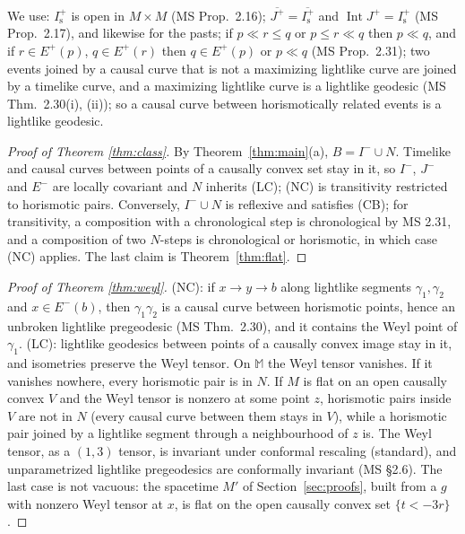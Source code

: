 \documentclass[11pt]{article}
\theoremstyle{definition}
\newcommand{\Mink}{\mathbb M}
\newcommand{\Ifut}{I^{+}}
\newcommand{\Ichr}{I^{-}}
\newcommand{\Jp}{J^{+}}
\newcommand{\Jm}{J^{-}}
\begin{document}
We use: $\Ifut_{\mathrm s}$ is open in $M\times M$ (MS Prop.~2.16);
$\overline{\Jp}=\overline{\Ifut_{\mathrm s}}$ and $\operatorname{Int}\Jp=
\Ifut_{\mathrm s}$ (MS Prop.~2.17), and likewise for the pasts; if $p\ll r\le q$
or $p\le r\ll q$ then $p\ll q$, and if $r\in E^+(p)$, $q\in E^+(r)$ then
$q\in E^+(p)$ or $p\ll q$ (MS Prop.~2.31); two events joined by a causal
curve that is not a maximizing lightlike curve are joined by a timelike curve,
and a maximizing lightlike curve is a lightlike geodesic (MS Thm.~2.30(i),
(ii)); so a causal curve between horismotically related events is a lightlike
geodesic.

\begin{proof}[Proof of Theorem \ref{thm:class}]
By Theorem~\ref{thm:main}(a), $B=\Ichr\cup N$. Timelike and causal curves
between points of a causally convex set stay in it, so $\Ichr$, $\Jm$ and $E^-$
are locally covariant and $N$ inherits (LC); (NC) is transitivity restricted
to horismotic pairs. Conversely, $\Ichr\cup N$ is reflexive and satisfies (CB);
for transitivity, a composition with a chronological step is chronological by
MS 2.31, and a composition of two $N$-steps is chronological or horismotic, in
which case (NC) applies. The last claim is Theorem~\ref{thm:flat}.
\end{proof}

\begin{proof}[Proof of Theorem \ref{thm:weyl}]
(NC): if $x\to y\to b$ along lightlike segments $\gamma_1,\gamma_2$ and
$x\in E^-(b)$, then $\gamma_1\gamma_2$ is a causal curve between horismotic
points, hence an unbroken lightlike pregeodesic (MS Thm.~2.30), and it
contains the Weyl point of $\gamma_1$. (LC): lightlike geodesics between points
of a causally convex image stay in it, and isometries preserve the Weyl
tensor. On $\Mink$ the Weyl tensor vanishes. If it vanishes nowhere, every
horismotic pair is in $N$. If $M$ is flat on an open causally convex $V$ and
the Weyl tensor is nonzero at some point $z$, horismotic pairs inside $V$ are
not in $N$ (every causal curve between them stays in $V$), while a horismotic
pair joined by a lightlike segment through a neighbourhood of $z$ is. The Weyl
tensor, as a $(1,3)$ tensor, is invariant under conformal rescaling (standard),
and unparametrized lightlike pregeodesics are conformally invariant (MS
\S2.6). The last case is not vacuous: the spacetime $M'$ of
Section~\ref{sec:proofs}, built from a $g$ with nonzero Weyl tensor at $x$, is
flat on the open causally convex set $\{t<-3r\}$.
\end{proof}
\end{document}
